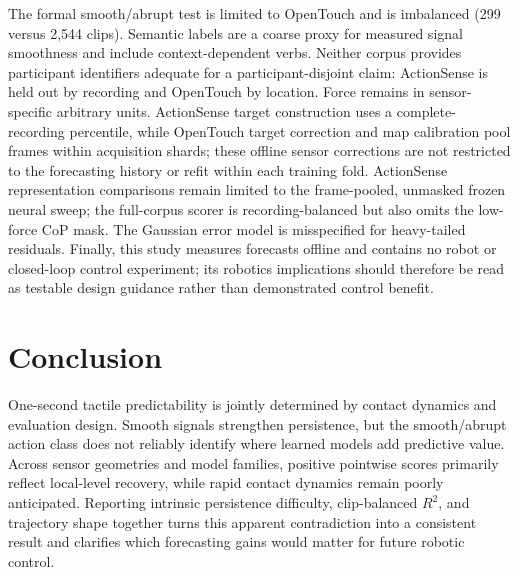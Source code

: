 \documentclass[letterpaper, 10 pt, conference]{ieeeconf}
\newcommand{\Rtwo}{R^{2}}
\begin{document}
The formal smooth/abrupt test is limited to OpenTouch and is imbalanced (299 versus 2,544 clips). Semantic labels are a coarse proxy for measured signal smoothness and include context-dependent verbs. Neither corpus provides participant identifiers adequate for a participant-disjoint claim: ActionSense is held out by recording and OpenTouch by location. Force remains in sensor-specific arbitrary units. ActionSense target construction uses a complete-recording percentile, while OpenTouch target correction and map calibration pool frames within acquisition shards; these offline sensor corrections are not restricted to the forecasting history or refit within each training fold. ActionSense representation comparisons remain limited to the frame-pooled, unmasked frozen neural sweep; the full-corpus scorer is recording-balanced but also omits the low-force CoP mask. The Gaussian error model is misspecified for heavy-tailed residuals. Finally, this study measures forecasts offline and contains no robot or closed-loop control experiment; its robotics implications should therefore be read as testable design guidance rather than demonstrated control benefit.

\section{Conclusion}
\label{sec:conclusion}

One-second tactile predictability is jointly determined by contact dynamics and evaluation design. Smooth signals strengthen persistence, but the smooth/abrupt action class does not reliably identify where learned models add predictive value. Across sensor geometries and model families, positive pointwise scores primarily reflect local-level recovery, while rapid contact dynamics remain poorly anticipated. Reporting intrinsic persistence difficulty, clip-balanced $\Rtwo$, and trajectory shape together turns this apparent contradiction into a consistent result and clarifies which forecasting gains would matter for future robotic control.

\end{document}
